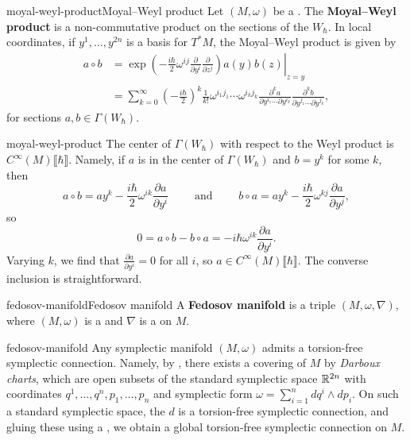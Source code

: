 \begin{topic}{moyal-weyl-product}{Moyal--Weyl product}
    Let $(M, \omega)$ be a . The \textbf{Moyal--Weyl product} is a non-commutative product on the sections of the  $W_\hbar$. In local coordinates, if $y^1, \ldots, y^{2n}$ is a basis for $T^*M$, the Moyal--Weyl product is given by
    \[ \begin{aligned}
        a \circ b
            &= \left. \exp \left(-\frac{i\hbar}{2} \omega^{ij} \frac{\partial}{\partial y^i} \frac{\partial}{\partial z^j}\right) a(y) b(z) \right|_{z = y} \\
            &= \sum_{k = 0}^{\infty} \left(-\frac{i\hbar}{2}\right)^k \frac{1}{k!} \omega^{i_1 j_1} \cdots \omega^{i_k j_k} \frac{\partial^k a}{\partial y^{i_1} \cdots \partial y^{i_k}} \frac{\partial^k b}{\partial y^{j_1} \cdots \partial y^{j_k}} ,
    \end{aligned} \]
    for sections $a, b \in \Gamma(W_\hbar)$.
\end{topic}

\begin{example}{moyal-weyl-product}
    The center of $\Gamma(W_\hbar)$ with respect to the Weyl product is $C^\infty(M)\llbracket \hbar \rrbracket$. Namely, if $a$ is in the center of $\Gamma(W_\hbar)$ and $b = y^k$ for some $k$, then
    \[ a \circ b = a y^k - \frac{i\hbar}{2} \omega^{ik} \frac{\partial a}{\partial y^i} \qquad \text{ and } \qquad b \circ a = a y^k - \frac{i\hbar}{2} \omega^{kj} \frac{\partial a}{\partial y^j} , \]
    so
    \[ 0 = a \circ b - b \circ a = - i \hbar \omega^{ik} \frac{\partial a}{\partial y^i} . \]
    Varying $k$, we find that $\frac{\partial a}{\partial y^i} = 0$ for all $i$, so $a \in C^\infty(M)\llbracket \hbar \rrbracket$. The converse inclusion is straightforward.
\end{example}

\begin{topic}{fedosov-manifold}{Fedosov manifold}
    A \textbf{Fedosov manifold} is a triple $(M, \omega, \nabla)$, where $(M, \omega)$ is a  and $\nabla$ is a   on $M$.
\end{topic}

\begin{example}{fedosov-manifold}
    Any symplectic manifold $(M, \omega)$ admits a torsion-free symplectic connection. Namely, by , there exists a covering of $M$ by \textit{Darboux charts}, which are open subsets of the standard symplectic space $\mathbb{R}^{2n}$ with coordinates $q^1, \ldots, q^n, p_1, \ldots, p_n$ and symplectic form $\omega = \sum_{i = 1}^{n} dq^i \wedge dp_i$. On such a standard symplectic space, the  $d$ is a torsion-free symplectic connection, and gluing these using a , we obtain a global torsion-free symplectic connection on $M$.
\end{example}

